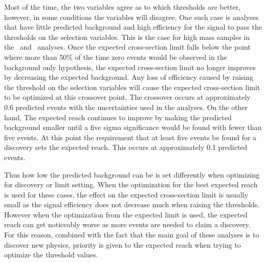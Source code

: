 Most of the time, the two variables agree as to which thresholds are better, however, in some
conditions the variables will disagree. One such case is analyses that have little predicted background and high efficiency for the signal to pass the thresholds on the
selection variables. This is the case for high mass samples in the \tktof\  and \tkonly\ analyses.
Once the expected cross-section limit falls below the point where more than 50\% of the time zero events would be observed in the background only hypothesis,
the expected cross-section limit no longer improves
by decreasing the expected background. Any loss of efficiency caused by raising the threshold on the selection variables will cause the expected cross-section limit to be optimized
at this crossover point. The crossover occurs at approximately 0.6 predicted events with the uncertainties used in the analyses. 
On the other hand, The expected reach continues to improve by making the predicted background smaller until a five sigma 
significance would be found with fewer than five events. At this
point the requirement that at least five events be found for a discovery sets the expected reach.
This occurs at approximately 0.1 predicted events. 

Thus how low the predicted background can be is set differently when optimizing for discovery or limit setting.
When the optimization for the best expected reach is used for these cases, the
effect on the expected cross-section limit is usually small as the signal efficiency does not decrease much when raising the thresholds. However
when the optimization from the expected limit is used, the expected reach can get noticeably worse as more events are needed to claim a discovery.
For this reason, combined with the fact that the main goal of these analyses is to discover new physics, priority
is given to the expected reach when trying to optimize the threshold values.


